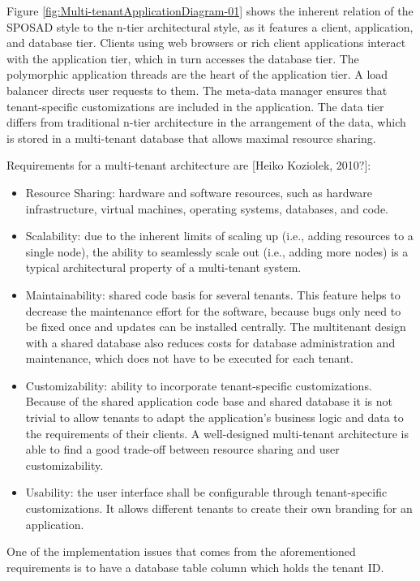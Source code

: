 Figure \ref{fig:Multi-tenantApplicationDiagram-01} shows the inherent relation of the SPOSAD style to the n-tier architectural style, as it features a client, application, and database tier. Clients using web browsers or rich client applications interact with the application tier, which in turn accesses the database tier. The polymorphic application threads are the heart of the application tier. A load balancer directs user requests to them. The meta-data manager ensures that tenant-specific customizations are included in the application. The data tier differs from traditional n-tier architecture in the arrangement of the data, which is stored in a multi-tenant database that allows maximal resource sharing.

Requirements for a multi-tenant architecture are [Heiko Koziolek, 2010?]:
\begin{itemize}
	\item Resource Sharing: hardware and software resources, such
as hardware infrastructure, virtual machines, operating systems, databases, and code.
	\item Scalability: due to the inherent limits of scaling up (i.e., adding resources to a single node), the ability to seamlessly scale out (i.e., adding more nodes) is a typical architectural property of a multi-tenant system.
	\item Maintainability: shared code basis for several tenants. This feature helps to decrease the maintenance effort for the software,
because bugs only need to be fixed once and updates can be installed centrally. The multitenant design with a shared database also reduces costs for database administration and maintenance, which does not have to be executed for each tenant.
	\item Customizability: ability to incorporate tenant-specific customizations. Because of the shared application code base
and shared database it is not trivial to allow tenants to adapt the application's business logic and data to the requirements of their clients. A well-designed multi-tenant architecture is able to find a good trade-off between resource sharing and user customizability.
	\item Usability: the user interface shall be configurable through tenant-specific customizations. It allows different tenants to create their own branding for an application.
\end{itemize}

One of the implementation issues that comes from the aforementioned requirements is to have a database table column which holds the tenant ID.


